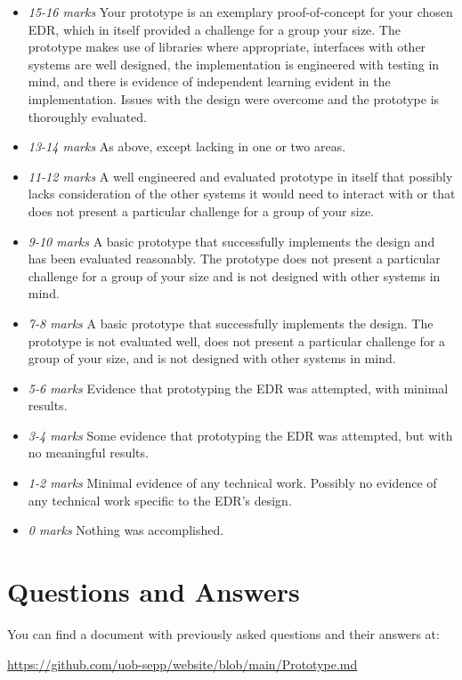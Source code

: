 \begin{itemize}
    \item \emph{15-16 marks} Your prototype is an exemplary proof-of-concept for your chosen EDR, which in itself provided a challenge for a group your size. The prototype makes use of libraries where appropriate, interfaces with other systems are well designed, the implementation is engineered with testing in mind, and there is evidence of independent learning evident in the implementation. Issues with the design were overcome and the prototype is thoroughly evaluated.
    \item \emph{13-14 marks} As above, except lacking in one or two areas.
    \item \emph{11-12 marks} A well engineered and evaluated prototype in itself that possibly lacks consideration of the other systems it would need to interact with or that does not present a particular challenge for a group of your size.
    \item \emph{9-10 marks} A basic prototype that successfully implements the design and has been evaluated reasonably. The prototype does not present a particular challenge for a group of your size and is not designed with other systems in mind.
    \item \emph{7-8 marks} A basic prototype that successfully implements the design. The prototype is not evaluated well, does not present a particular challenge for a group of your size, and is not designed with other systems in mind.
    \item \emph{5-6 marks} Evidence that prototyping the EDR was attempted, with minimal results.
    \item \emph{3-4 marks} Some evidence that prototyping the EDR was attempted, but with no meaningful results.
    \item \emph{1-2 marks} Minimal evidence of any technical work. Possibly no evidence of any technical work specific to the EDR's design.
    \item \emph{0 marks} Nothing was accomplished.
\end{itemize}

\section{Questions and Answers}

You can find a document with previously asked questions and their answers at:

\begin{center}
    \url{https://github.com/uob-sepp/website/blob/main/Prototype.md}
\end{center}
